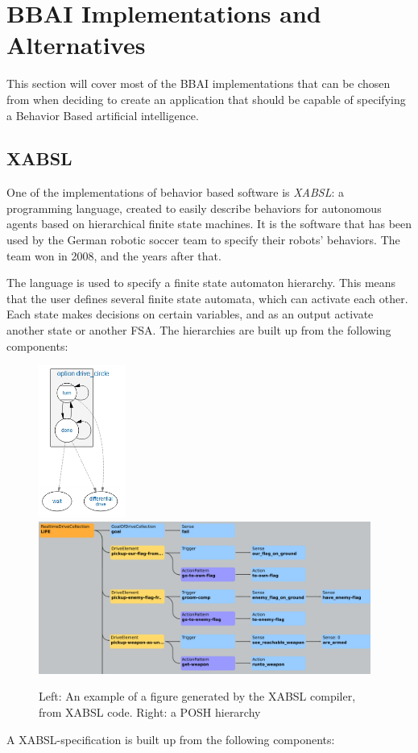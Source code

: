 \documentclass[a4paper,10pt]{article}
\begin{document}
\section{BBAI Implementations and Alternatives}
This section will cover most of the BBAI implementations that can be chosen from
when deciding to create an application that should be capable of specifying a
Behavior Based artificial intelligence. 

\subsection{XABSL}
One of the implementations of behavior based software is
\textit{XABSL}\cite{loetzsch2004xabsl}\cite{lotzsch2004designing}: a
 programming language, created to easily describe behaviors for autonomous agents
based on hierarchical finite state machines. It is the
software that has been used by the German robotic soccer team to specify their
robots' behaviors. The team won in 2008, and the years after that.

The language is used to specify a finite state automaton hierarchy. This means
that the user defines several finite state automata, which can activate each
other. Each state makes decisions on certain variables, and as an output
activate another state or another FSA. The hierarchies are built up from the
following components:

\begin{figure}
    \centering
        \includegraphics[height=5cm]{../files/option_drive_circle.png}
        \includegraphics[height=5cm]{images/POSH-smaller.png}
    \caption[XABSL hierarchy and POSH hierarchy]{Left: An example of a figure generated by the XABSL compiler, from
    XABSL code. Right: a POSH hierarchy}
    \label{fig:simpleFsm}
\end{figure}
A XABSL-specification is built up from the following components:
\end{document}
